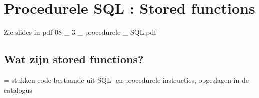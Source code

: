 \newpage

\section{Procedurele SQL : Stored functions}

Zie slides in pdf 08 \_ 3 \_ procedurele \_ SQL.pdf

\subsection{Wat zijn stored functions?}
= stukken code bestaande uit SQL- en procedurele instructies, opgeslagen in de catalogus

